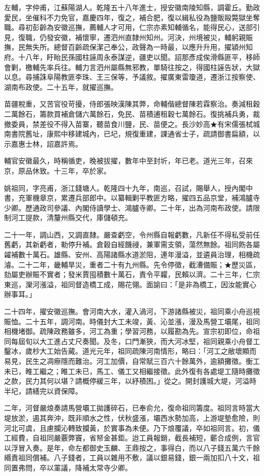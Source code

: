 \begin{pinyinscope}
左輔，字仲甫，江蘇陽湖人。乾隆五十八年進士，授安徽南陵知縣，調霍丘。勤政愛民，坐催科不力免官，嘉慶四年，復之，補合肥，復以緝私役為鹽販毆斃獄坐奪職。尋初彭齡為安徽巡撫，薦輔人才可用，仁宗亦素知輔循名，能得民心，送部引見，復職，仍發安徽，補懷寧，遷泗州直隸州知州。河決，州境被災，輔躬親賑撫，民無失所。總督百齡疏保潔己奉公，政聲為一時最，以應升升用，擢潁州知府。十八年，盱眙民孫國柱誣周永泰謀逆，疆吏以聞。詔那彥成俟滑縣匪平，移師會剿，檄輔先率兵往。輔力言泗州屬縣無邪教，單騎往按之，得國柱誣告狀，大獄以息。尋捕誅阜陽教匪李珠、王三保等，予議敘。擢廣東雷瓊道，遷浙江按察使、湖南布政使。二十五年，就擢巡撫。

苗疆稅重，又苦官役苛擾，侍郎張映漢陳其弊，命輔偕總督陳若霖察治。奏減租穀二萬餘石，籌款買補倉儲六萬餘石，免民、苗積逋租穀七萬餘石。復挑補兵勇，裁撤委員，禁差役不得入苗寨，聽苗食川鹽，民、苗便之。長沙妙高★有宋儒張栻城南書院舊址，康熙中移建城內，已圮，規復重建，課通省士子，疏請御書扁額，以示嘉惠士林，詔嘉許焉。

輔官安徽最久，時稱循吏，晚被拔擢，數年中至封圻，年已老。道光三年，召來京，原品休致。十三年，卒於家。

姚祖同，字亮甫，浙江錢塘人。乾隆四十九年，南巡，召試，賜舉人，授內閣中書，充軍機章京，累遷兵部郎中。以纂輯剿平教匪方略，擢四五品京堂，補鴻臚寺少卿。歷通政司參議、內閣侍讀學士、鴻臚寺卿。二十年，出為河南布政使。請限制河工提款，清釐州縣交代，庫儲頓充。

二十一年，調山西，又調直隸。嚴查虧空，令州縣自報虧數，凡新任不得私受前任舊虧，其新虧者，勒停升補。倉穀自經饑祲，兼軍需支領，蕩然無餘。祖同飭各屬糴補數十萬石。雄縣、安州、高陽諸縣水道淤阻，連年漫溢，並遴員治理，相機疏濬。二十二年，畿輔旱災，重者二十有九州縣。先令停徵，截漕備賑；★歷災區，劾屬吏辦賑不實者；發米賈囤積數十萬石，責令平糶，民賴以濟。二十三年，仁宗東巡，灤河漲溢，祖同督造橋工成，賜花翎。面諭曰：「是非為橋工，因汝能實心辦事耳。」

二十四年，擢安徽巡撫。會河南大水，灌入渦河，下游諸縣被災，祖同乘小舟巡視賑恤。二十五年，調河南。時儀封大工未竣，黃、沁並漲，漫及馬營工壩尾，祖同相機堵御。疏陳政務雖多，河工為重；學習河務，以履勘為先。宣宗初即位，命祖同每屆旬以大工進占丈尺奏聞。及冬，口門漸狹，而大河冰堅，祖同親乘小舟督工鑿冰，歲杪大工始告蕆。道光元年，祖同疏陳河南情形，略曰：「河工之敝壞顯而易見，民生之凋瘵隱而難治。河工加價，自常賦三百六十餘萬外，逾額攤徵。衡工未已，睢工繼之；睢工未已，馬工、儀工又相繼接徵。此外復有各處堤工隨時攤徵之款，民力其何以堪？請概停緩三年，以紓積困。」從之。開封護城大堤，河溢時半圮，請繕完以資保障。

二年，河督嚴烺奏請馬營壩工拋護碎石，已奉俞允，復命祖同籌度。祖同言時當大堤放淤，遏其奔沖，既非順水之性，伏秋盛漲，壩西水勢加高，上游堤墊愈險，則河北可虞，且慮攔沁轉致攔黃，於實事為未便。乃下烺覆議，卒如祖同言。初，儀工經費，自祖同嚴覈弊竇，省帑金甚鉅。迨工員報銷，截長補短，蘄合成例，言官以浮冒入奏。是年，命左都御史玉麟、王鼎按之，事得白，而以八子錢五萬六千餘緡責祖同償補。八子錢者，工員以雜用不敷，議以銀易錢，銀一兩加扣八十文，祖同置弗問，卒以罣議，降補太常寺少卿。


\end{pinyinscope}
